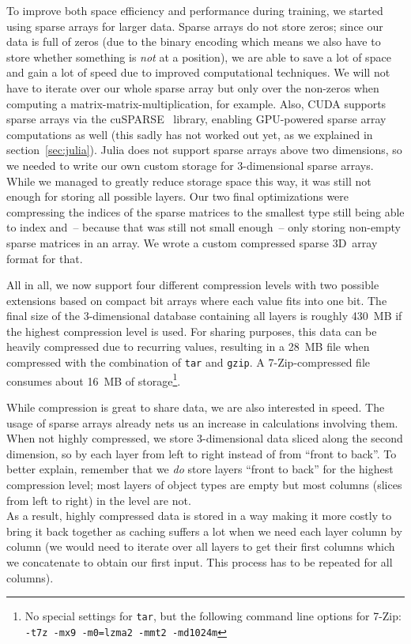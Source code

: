 To improve both space efficiency and performance during training, we
started using sparse arrays for larger data. Sparse arrays do not
store zeros; since our data is full of zeros (due to the binary
encoding which means we also have to store whether something is
\emph{not} at a position), we are able to save a lot of space and gain
a lot of speed due to improved computational techniques. We will not
have to iterate over our whole sparse array but only over the
non-zeros when computing a matrix-matrix-multiplication, for example.
Also, CUDA supports sparse arrays via the
\mbox{cuSPARSE}~\cite{CuSPARSE2012} library, enabling GPU-powered
sparse array computations as well (this sadly has not worked out yet,
as we explained in section~\ref{sec:julia}). Julia does not support
sparse arrays above two dimensions, so we needed to write our own
custom storage for 3-dimensional sparse arrays. While we managed to
greatly reduce storage space this way, it was still not enough for
storing all possible layers. Our two final optimizations were
compressing the indices of the sparse matrices to the smallest type
still being able to index and~-- because that was still not small
enough~-- only storing non-empty sparse matrices in an array. We wrote
a custom compressed sparse 3D~array format for that.

All in all, we now support four different compression levels with two
possible extensions based on compact bit arrays where each value fits
into one bit. The final size of the 3-dimensional database containing
all layers is roughly 430~MB if the highest compression level is used.
For sharing purposes, this data can be heavily compressed due to
recurring values, resulting in a 28~MB file when compressed with the
combination of \texttt{tar} and \texttt{gzip}. A
\mbox{7-Zip}-compressed file consumes about 16~MB of
storage\footnote{No special settings for \texttt{tar}, but the
  following command line options for \mbox{7-Zip}: \texttt{-t7z -mx9
    -m0=lzma2 -mmt2 -md1024m}}.
\medskip

While compression is great to share data, we are also interested in
speed. The usage of sparse arrays already nets us an increase in
calculations involving them. When not highly compressed, we store
3-dimensional data sliced along the second dimension, so by each layer
from left to right instead of from ``front to back''. To better
explain, remember that we \emph{do} store layers ``front to back'' for
the highest compression level; most layers of object types are empty
but most columns (slices from left to right) in the level are
not. \\
As a result, highly compressed data is stored in a way making it more
costly to bring it back together as caching suffers a lot when we need
each layer column by column (we would need to iterate over all layers
to get their first columns which we concatenate to obtain our first
input. This process has to be repeated for all columns).

